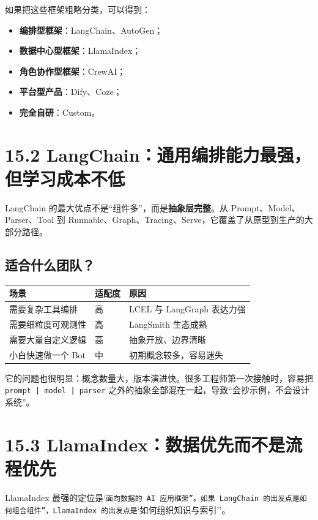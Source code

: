 如果把这些框架粗略分类，可以得到：


\begin{itemize}[leftmargin=2em]
\item \textbf{编排型框架}：LangChain、AutoGen；
\item \textbf{数据中心型框架}：LlamaIndex；
\item \textbf{角色协作型框架}：CrewAI；
\item \textbf{平台型产品}：Dify、Coze；
\item \textbf{完全自研}：Custom。
\end{itemize}

\section{15.2 LangChain：通用编排能力最强，但学习成本不低}

LangChain 的最大优点不是``组件多''，而是\textbf{抽象层完整}。从 Prompt、Model、Parser、Tool 到 Runnable、Graph、Tracing、Serve，它覆盖了从原型到生产的大部分路径。


\subsection{适合什么团队？}

\begingroup
\scriptsize
\setlength{\tabcolsep}{3pt}
\begin{longtable}{|p{}|p{}|p{}|}
\hline
场景 & 适配度 & 原因 \\ \hline
需要复杂工具编排 & 高 & LCEL 与 LangGraph 表达力强 \\ \hline
需要细粒度可观测性 & 高 & LangSmith 生态成熟 \\ \hline
需要大量自定义逻辑 & 高 & 抽象开放、边界清晰 \\ \hline
小白快速做一个 Bot & 中 & 初期概念较多，容易迷失 \\ \hline
\end{longtable}
\endgroup

它的问题也很明显：概念数量大，版本演进快。很多工程师第一次接触时，容易把 \texttt{prompt | model | parser} 之外的抽象全部混在一起，导致``会抄示例，不会设计系统''。


\section{15.3 LlamaIndex：数据优先而不是流程优先}

LlamaIndex 最强的定位是`\texttt{面向数据的 AI 应用框架''。如果 LangChain 的出发点是}\texttt{如何组合组件''，LlamaIndex 的出发点是}`如何组织知识与索引''。


